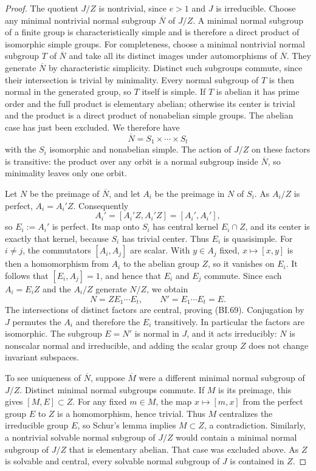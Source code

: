 \begin{proof}
The quotient $J/Z$ is nontrivial, since $e>1$ and $J$ is
irreducible.  Choose any minimal nontrivial normal subgroup
$\overline N$ of $J/Z$.  A minimal normal subgroup of a finite
group is characteristically simple and is therefore a direct
product of isomorphic simple groups.  For completeness, choose a
minimal nontrivial normal subgroup $T$ of $\overline N$ and take
all its distinct images under automorphisms of $\overline N$.
They generate $\overline N$ by characteristic simplicity.
Distinct such subgroups commute, since their intersection is
trivial by minimality.  Every normal subgroup of $T$ is then
normal in the generated group, so $T$ itself is simple.  If $T$
is abelian it has prime order and the full product is elementary
abelian; otherwise its center is trivial and the product is a
direct product of nonabelian simple groups.  The abelian case has
just been excluded.  We therefore have
\[
                \overline N=S_1\times\cdots\times S_t
\]
with the $S_i$ isomorphic and nonabelian simple.  The action of
$J/Z$ on these factors is transitive: the product over any orbit
is a normal subgroup inside $\overline N$, so minimality leaves
only one orbit.

Let $N$ be the preimage of $\overline N$, and let $A_i$ be the
preimage in $N$ of $S_i$.  As $A_i/Z$ is perfect,
$A_i=A_i'Z$.  Consequently
\[
           A_i'=[A_i'Z,A_i'Z]=[A_i',A_i'],
\]
so $E_i:=A_i'$ is perfect.  Its map onto $S_i$ has central
kernel $E_i\cap Z$, and its center is exactly that kernel,
because $S_i$ has trivial center.  Thus $E_i$ is quasisimple.
For $i\ne j$, the commutators $[A_i,A_j]$ are scalar.  With
$y\in A_j$ fixed, $x\mapsto[x,y]$ is then a homomorphism from
$A_i$ to the abelian group $Z$, so it vanishes on $E_i$.
It follows that $[E_i,A_j]=1$, and hence that $E_i$ and $E_j$
commute.  Since each $A_i=E_iZ$ and the $A_i/Z$ generate
$N/Z$, we obtain
\[
                        N=Z E_1\cdots E_t,
                        \qquad N'=E_1\cdots E_t=E.
\]
The intersections of distinct factors are central, proving
(BI.69).  Conjugation by $J$ permutes the $A_i$ and therefore
the $E_i$ transitively.  In particular the factors are isomorphic.
The subgroup $E=N'$ is normal in $J$, and it acts irreducibly:
$N$ is nonscalar normal and irreducible, and adding the scalar
group $Z$ does not change invariant subspaces.

To see uniqueness of $\overline N$, suppose
$\overline M$ were a different minimal normal subgroup of
$J/Z$.  Distinct minimal normal subgroups commute.  If $M$ is
its preimage, this gives $[M,E]\subset Z$.  For any fixed
$m\in M$, the map $x\mapsto[m,x]$ from the perfect group $E$
to $Z$ is a homomorphism, hence trivial.  Thus $M$ centralizes
the irreducible group $E$, so Schur's lemma implies $M\subset Z$,
a contradiction.  Similarly, a nontrivial solvable normal subgroup
of $J/Z$ would contain a minimal normal subgroup of $J/Z$ that
is elementary abelian.  That case was excluded above.  As $Z$
is solvable and central, every solvable normal subgroup of $J$
is contained in $Z$.


\end{proof}
